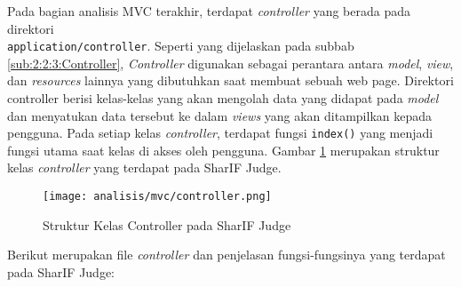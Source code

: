 Pada bagian analisis MVC terakhir, terdapat \textit{controller} yang berada pada direktori \\ \verb|application/controller|. Seperti yang dijelaskan pada subbab \ref{sub:2:2:3:Controller}, \textit{Controller} digunakan sebagai perantara antara \textit{model}, \textit{view}, dan \textit{resources} lainnya yang dibutuhkan saat membuat sebuah web page. Direktori controller berisi kelas-kelas yang akan mengolah data yang didapat pada \textit{model} dan menyatukan data tersebut ke dalam \textit{views} yang akan ditampilkan kepada pengguna. Pada setiap kelas \textit{controller}, terdapat fungsi \verb|index()| yang menjadi fungsi utama saat kelas di akses oleh pengguna.
Gambar \ref{fig:3:1:1:controller} merupakan struktur kelas \textit{controller} yang terdapat pada SharIF Judge.
\begin{figure}[H]
	\centering
	\texttt{[image: analisis/mvc/controller.png]}
	\caption{Struktur Kelas Controller pada SharIF Judge}
	\label{fig:3:1:1:controller}
\end{figure}
Berikut merupakan file \textit{controller} dan penjelasan fungsi-fungsinya yang terdapat pada SharIF Judge:

